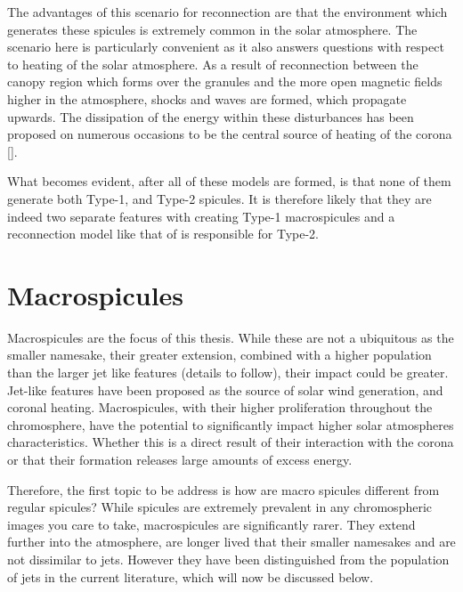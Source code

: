 The advantages of this scenario for reconnection are that the environment which generates these spicules is extremely common in the solar atmosphere.
The scenario here is particularly convenient as it also answers questions with respect to heating of the solar atmosphere.
As a result of reconnection between the canopy region which forms over the granules and the more open magnetic fields higher in the atmosphere, shocks and waves are formed, which propagate upwards.
The dissipation of the energy within these disturbances has been proposed on numerous occasions to be the central source of heating of the corona [\cite{Klimchuk2012, Kudoh1999, Athay2000}]. 

What becomes evident, after all of these models are formed, is that none of them generate both Type-1, and Type-2 spicules.
It is therefore likely that they are indeed two separate features with \cite{DePointeu2004} creating Type-1 macrospicules and a reconnection model like that of \cite{Moore2011spic_recon} is responsible for Type-2.


\section{Macrospicules}
\label{sec:MS}

Macrospicules are the focus of this thesis.
While these are not a ubiquitous as the smaller namesake, their greater extension, combined with a higher population than the larger jet like features (details to follow), their impact could be greater.
Jet-like features have been proposed as the source of solar wind generation, and coronal heating. 
Macrospicules, with their higher proliferation throughout the chromosphere, have the potential to significantly impact higher solar atmospheres characteristics. 
Whether this is a direct result of their interaction with the corona or that their formation releases large amounts of excess energy.

Therefore, the first topic to be address is how are macro spicules different from regular spicules?
While spicules are extremely prevalent in any chromospheric images you care to take, macrospicules are significantly rarer.
They extend further into the atmosphere, are longer lived that their smaller namesakes and are not dissimilar to jets. 
However they have been distinguished from the population of jets in the current literature, which will now be discussed below.

